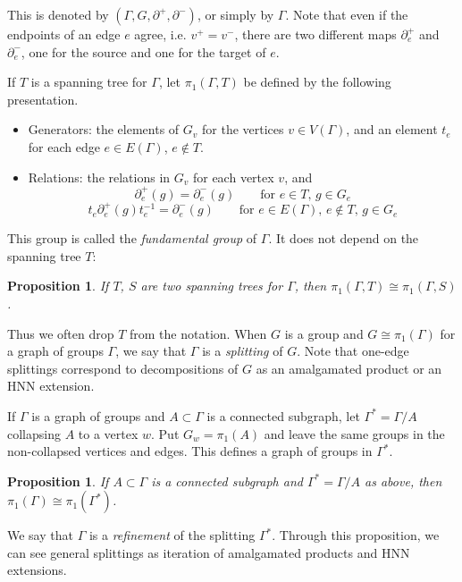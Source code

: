 \documentclass[12pt]{amsart}
\newtheorem{proposition}[theorem]{Proposition}
\begin{document}
This is denoted by $(\Gamma,G,\partial^+,\partial^-)$, or simply by $\Gamma$. Note that even if the endpoints of an edge $e$ agree, i.e. $v^+=v^-$, there are two different maps $\partial_e^+$ and $\partial_e^-$, one for the source and one for the target of $e$.

If $T$ is a spanning tree for $\Gamma$, let $\pi_1(\Gamma,T)$ be defined by the following presentation.

\begin{itemize}
\item Generators: the elements of $G_v$ for the vertices $v\in V(\Gamma)$, and an element $t_e$ for each edge $e\in E(\Gamma)$, $e\notin T$.

\item Relations: the relations in $G_v$ for each vertex $v$, and 
\[ \partial_e^+(g)=\partial_e^-(g) \qquad \mbox{for } e\in T,\, g\in G_e \]
\[ t_e\partial_e^+(g) t_e^{-1} = \partial_e^-(g) \qquad \mbox{for } e\in E(\Gamma),\, e\notin T,\, g\in G_e \] 

\end{itemize}

This group is called the {\em fundamental group} of $\Gamma$. It does not depend on the spanning tree $T$:

\begin{proposition} If $T$, $S$ are two spanning trees for $\Gamma$, then $\pi_1(\Gamma,T)\cong\pi_1(\Gamma,S)$.
\end{proposition}

Thus we often drop $T$ from the notation.
When $G$ is a group and $G\cong \pi_1(\Gamma)$ for a graph of groups $\Gamma$, we say that $\Gamma$ is a {\em splitting} of $G$.
Note that one-edge splittings correspond to decompositions of $G$ as an amalgamated product or an HNN extension.

If $\Gamma$ is a graph of groups and $A\subset\Gamma$ is a connected subgraph, let $\Gamma^* = \Gamma/A$ collapsing $A$ to a vertex $w$. Put $G_w = \pi_1(A)$ and leave the same groups in the non-collapsed vertices and edges. This defines a graph of groups in $\Gamma^*$.


\begin{proposition} If $A\subset\Gamma$ is a connected subgraph and $\Gamma^*=\Gamma/A$ as above, then $\pi_1(\Gamma)\cong\pi_1(\Gamma^*)$.
\end{proposition}

We say that $\Gamma$ is a {\em refinement} of the splitting $\Gamma^*$. Through this proposition, we can see general splittings as iteration of amalgamated products and HNN extensions.
\end{document}
